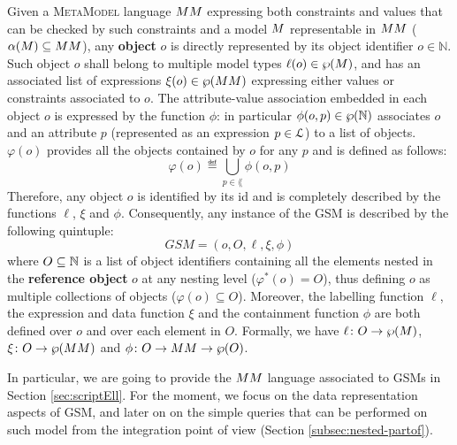 \begin{definition}
Given a \textsc{MetaModel}  language $\metamodel$ expressing both constraints and values that can be checked by such constraints and a model $\model$ representable in $\metamodel$ ($\abstr(\model)\subseteq\metamodel$), any \textbf{object} $o$ is directly represented by its object identifier $o\in \mathbb{N}$. Such object $o$ shall belong to multiple model types $\ell(o)\in\partof{\model}$, and has an associated list of expressions $\xi(o)\in\partof{\metamodel}$ expressing either values or constraints associated to $o$. The attribute-value association embedded in each object $o$ is expressed by the function $\phi$: in particular $\phi(o,p)\in\wp(\mathbb{N})$ associates $o$ and an attribute $p$ (represented as an expression $p\in\langg$) to a list of objects. $\varphi(o)$ provides all the objects contained by $o$ for any $p$ and is defined as follows:
\[\varphi(o)\eqdef \bigcup_{p\in\lang}\phi(o,p)\]
Therefore, any object $o$ is identified by its id and is completely described by the functions $\ell$, $\xi$ and $\phi$. Consequently, any instance of the GSM is described by the following quintuple:
\[GSM=(o,O,\ell,\xi,\phi)\]
where $O\subseteq \mathbb{N}$ is a list of object identifiers containing all the elements nested in the \textbf{reference object} $o$ at any nesting level ($\varphi^*(o)=O$), thus defining $o$ as multiple collections of objects ($\varphi(o)\subseteq O$). Moreover, the labelling function $\ell$, the expression and data function $\xi$ and the containment function $\phi$ are both defined over $o$ and over each element in $O$. Formally, we have $\ell\colon O\to \partof{\model}$, $\xi\colon O\to \partof{\metamodel}$ and $\phi\colon O\to \metamodel\to\partof{O}$.

\end{definition}

In particular, we are going to provide the $\metamodel$ language associated to GSMs in Section \vref{sec:scriptEll}. For the moment, we  focus on the data representation aspects of GSM, and later on on the simple queries that can be performed on such model from the integration point of view (Section \vref{subsec:nested-partof}). 

